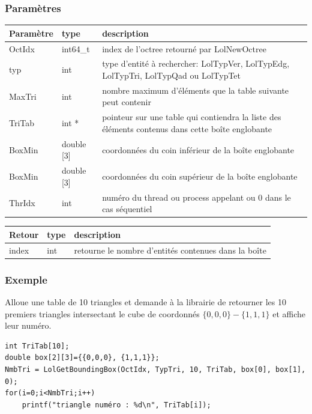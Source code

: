 \documentclass[a4paper,12pt]{article}
\begin{document}
\subsubsection*{Paramètres}
\begin{tabular}{|m{3cm}|m{2cm}|m{8.5cm}|}
\hline
Paramètre  & type      & description \\
\hline
OctIdx     & int64\_t  & index de l'octree retourné par LolNewOctree \\
\hline
typ        & int       & type d'entité à rechercher: LolTypVer, LolTypEdg, LolTypTri, LolTypQad ou LolTypTet \\
\hline
MaxTri     & int       & nombre maximum d'éléments que la table suivante peut contenir \\
\hline
TriTab     & int *     & pointeur sur une table qui contiendra la liste des éléments contenus dans cette boîte englobante \\
\hline
BoxMin     & double [3] & coordonnées du coin inférieur de la boîte englobante \\
\hline
BoxMin     & double [3] & coordonnées du coin supérieur de la boîte englobante \\
\hline
ThrIdx     & int        & numéro du thread ou process appelant ou 0 dans le cas séquentiel \\
\hline
\end{tabular}

\medskip

\begin{tabular}{|m{3cm}|m{2cm}|m{8.5cm}|}
\hline
Retour     & type   & description \\
\hline
index      & int    & retourne le nombre d'entités contenues dans la boîte \\
\hline
\end{tabular}

\subsubsection*{Exemple}
Alloue une table de 10 triangles et demande à la librairie de retourner les 10 premiers triangles intersectant le cube de coordonnés $\{0,0,0\} - \{1,1,1\}$ et affiche leur numéro.

\begin{tt}
\begin{verbatim}
int TriTab[10];
double box[2][3]={{0,0,0}, {1,1,1}};
NmbTri = LolGetBoundingBox(OctIdx, TypTri, 10, TriTab, box[0], box[1], 0);
for(i=0;i<NmbTri;i++)
    printf("triangle numéro : %d\n", TriTab[i]);
\end{verbatim}
\end{tt}
\normalfont
\end{document}
